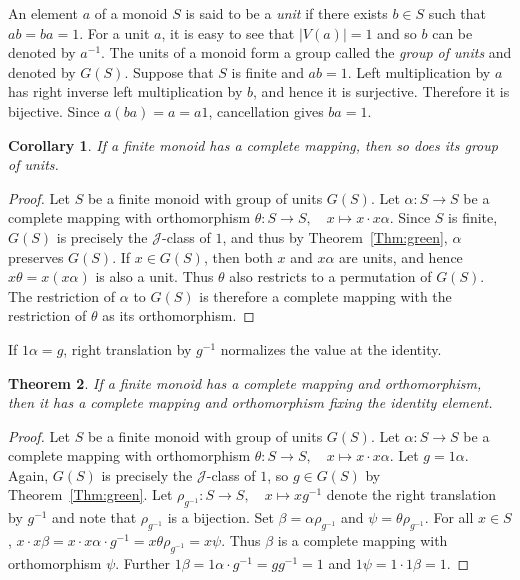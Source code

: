 \documentclass[11pt]{article}
\theoremstyle{plain}
\newtheorem{theorem}{Theorem}[section]
\newtheorem{cor}[theorem]{Corollary}
\theoremstyle{remark}
\theoremstyle{definition}
\theoremstyle{plain}
\newcommand{\inv}{^{-1}}
\newcommand\gj{\mathcal{J}}
\begin{document}
An element $a$ of a monoid $S$ is said to be a \emph{unit} if there exists $b\in S$ such that $ab=ba=1$. For a unit $a$, it is easy to see that $|V(a)|= 1$ and
so $b$ can be denoted by $a\inv$.
The units of a monoid form a group called the \emph{group of units} and denoted by $G(S)$. Suppose that $S$ is finite and $ab=1$. Left multiplication by $a$ has right inverse left multiplication by $b$, and hence it is surjective. Therefore it is bijective. Since $a(ba)=a=a1$, cancellation gives $ba=1$.

\begin{cor}\label{Cor:units}
 If a finite monoid has a complete mapping, then so does its group of units.
\end{cor}
\begin{proof}
  Let $S$ be a finite monoid with group of units $G(S)$. Let $\alpha\colon S\to S$ be a complete mapping with orthomorphism $\theta\colon S\to S,\quad x\mapsto x\cdot x\alpha$.
  Since $S$ is finite, $G(S)$ is precisely the $\gj$-class of $1$, and thus by Theorem~\ref{Thm:green}, $\alpha$ preserves $G(S)$.
  If $x\in G(S)$, then both $x$ and $x\alpha$ are units, and hence
  $x\theta=x(x\alpha)$ is also a unit. Thus $\theta$ also restricts to a
  permutation of $G(S)$. The restriction of $\alpha$ to $G(S)$ is therefore a
  complete mapping with the restriction of $\theta$ as its orthomorphism.
\end{proof}

If $1\alpha=g$, right translation by $g^{-1}$ normalizes the value at the identity.

\begin{theorem}\label{Thm:fix_ident}
  If a finite monoid has a complete mapping and orthomorphism, then it has a complete mapping and orthomorphism fixing the identity element.
\end{theorem}
\begin{proof}
    Let $S$ be a finite monoid with group of units $G(S)$. Let $\alpha\colon S\to S$ be a complete mapping with orthomorphism $\theta\colon S\to S,\quad x\mapsto x\cdot x\alpha$.
    Let $g=1\alpha$. Again, $G(S)$ is precisely the $\gj$-class of $1$, so $g\in G(S)$ by Theorem~\ref{Thm:green}. Let $\rho_{g\inv}\colon S\to S,\quad x\mapsto xg\inv$ denote
    the right translation by $g\inv$ and note that $\rho_{g\inv}$ is a bijection. Set $\beta=\alpha\rho_{g\inv}$ and $\psi=\theta\rho_{g\inv}$. For all $x\in S$, $x\cdot x\beta = x\cdot x\alpha\cdot g\inv = x\theta\rho_{g\inv} = x\psi$. Thus $\beta$ is a complete mapping with orthomorphism $\psi$. Further $1\beta = 1\alpha\cdot g\inv = gg\inv =1$
    and $1\psi = 1\cdot 1\beta = 1$.
\end{proof}
\end{document}
